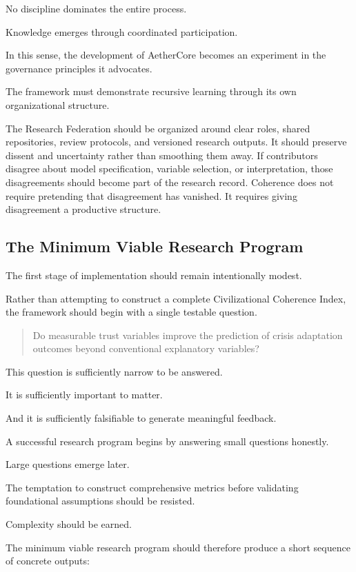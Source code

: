\documentclass[12pt]{article}
\begin{document}
No discipline dominates the entire process.

Knowledge emerges through coordinated participation.

In this sense, the development of AetherCore becomes an experiment in the governance principles it advocates.

The framework must demonstrate recursive learning through its own organizational structure.

The Research Federation should be organized around clear roles, shared repositories, review protocols, and versioned research outputs. It should preserve dissent and uncertainty rather than smoothing them away. If contributors disagree about model specification, variable selection, or interpretation, those disagreements should become part of the research record. Coherence does not require pretending that disagreement has vanished. It requires giving disagreement a productive structure.

\subsection{The Minimum Viable Research Program}

The first stage of implementation should remain intentionally modest.

Rather than attempting to construct a complete Civilizational Coherence Index, the framework should begin with a single testable question.

\begin{quote}
Do measurable trust variables improve the prediction of crisis adaptation outcomes beyond conventional explanatory variables?
\end{quote}

This question is sufficiently narrow to be answered.

It is sufficiently important to matter.

And it is sufficiently falsifiable to generate meaningful feedback.

A successful research program begins by answering small questions honestly.

Large questions emerge later.

The temptation to construct comprehensive metrics before validating foundational assumptions should be resisted.

Complexity should be earned.

The minimum viable research program should therefore produce a short sequence of concrete outputs:
\end{document}

